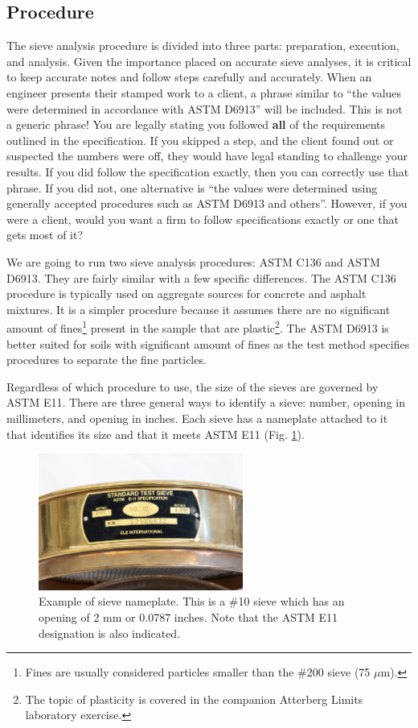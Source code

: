 \documentclass[12pt]{article}
\begin{document}
\pagebreak
\subsection{Procedure}
The sieve analysis procedure is divided into three parts: preparation, execution, and analysis. Given the importance placed on accurate sieve analyses, it is critical to keep accurate notes and follow steps carefully and accurately. When an engineer presents their stamped work to a client, a phrase similar to ``the values were determined in accordance with ASTM D6913'' will be included. This is not a generic phrase! You are legally stating you followed \textbf{all} of the requirements outlined in the specification. If you skipped a step, and the client found out or suspected the numbers were off, they would have legal standing to challenge your results. If you did follow the specification exactly, then you can correctly use that phrase. If you did not, one alternative is ``the values were determined using generally accepted procedures such as ASTM D6913 and others''. However, if you were a client, would you want a firm to follow specifications exactly or one that gets most of it?

We are going to run two sieve analysis procedures: ASTM C136 and ASTM D6913. They are fairly similar with a few specific differences. The ASTM C136 procedure is typically used on aggregate sources for concrete and asphalt mixtures. It is a simpler procedure because it assumes there are no significant amount of fines\footnote{Fines are usually considered particles smaller than the \#200 sieve (75 $\mu$m).} present in the sample that are plastic\footnote{The topic of plasticity is covered in the companion Atterberg Limits laboratory exercise.}. The ASTM D6913 is better suited for soils with significant amount of fines as the test method specifies procedures to separate the fine particles.

Regardless of which procedure to use, the size of the sieves are governed by ASTM E11. There are three general ways to identify a sieve: number, opening in millimeters, and opening in inches. Each sieve has a nameplate attached to it that identifies its size and that it meets ASTM E11 (Fig. \ref{fig:examplesieveplate}).

\begin{figure}[H]
    \centering
    \includegraphics[width=0.6\textwidth]{GEO_5699-2.jpg}
    \caption{Example of sieve nameplate. This is a \#10 sieve which has an opening of 2 mm or 0.0787 inches. Note that the ASTM E11 designation is also indicated.}
    \label{fig:examplesieveplate}
\end{figure}
\end{document}
